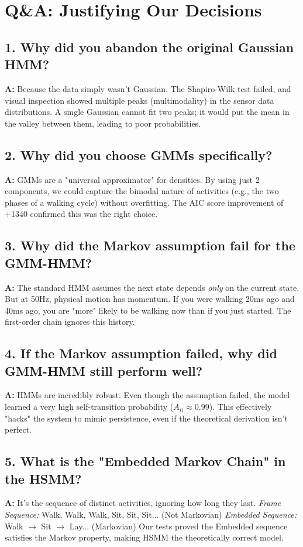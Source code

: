 \documentclass[11pt,a4paper]{article}
\begin{document}
\section{Q\&A: Justifying Our Decisions}

\subsection{1. Why did you abandon the original Gaussian HMM?}
\textbf{A:} Because the data simply wasn't Gaussian. The Shapiro-Wilk test failed, and visual inspection showed multiple peaks (multimodality) in the sensor data distributions. A single Gaussian cannot fit two peaks; it would put the mean in the valley between them, leading to poor probabilities.

\subsection{2. Why did you choose GMMs specifically?}
\textbf{A:} GMMs are a "universal approximator" for densities. By using just 2 components, we could capture the bimodal nature of activities (e.g., the two phases of a walking cycle) without overfitting. The AIC score improvement of +1340 confirmed this was the right choice.

\subsection{3. Why did the Markov assumption fail for the GMM-HMM?}
\textbf{A:} The standard HMM assumes the next state depends \textit{only} on the current state. But at 50Hz, physical motion has momentum. If you were walking 20ms ago and 40ms ago, you are "more" likely to be walking now than if you just started. The first-order chain ignores this history.

\subsection{4. If the Markov assumption failed, why did GMM-HMM still perform well?}
\textbf{A:} HMMs are incredibly robust. Even though the assumption failed, the model learned a very high self-transition probability ($A_{ii} \approx 0.99$). This effectively "hacks" the system to mimic persistence, even if the theoretical derivation isn't perfect.

\subsection{5. What is the "Embedded Markov Chain" in the HSMM?}
\textbf{A:} It's the sequence of distinct activities, ignoring how long they last.
\textit{Frame Sequence:} Walk, Walk, Walk, Sit, Sit, Sit... (Not Markovian)
\textit{Embedded Sequence:} Walk $\to$ Sit $\to$ Lay... (Markovian)
Our tests proved the Embedded sequence satisfies the Markov property, making HSMM the theoretically correct model.
\end{document}
